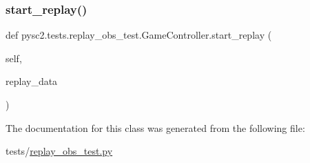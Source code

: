 \subsubsection{\texorpdfstring{start\+\_\+replay()}{start\_replay()}}
{\footnotesize\ttfamily def pysc2.\+tests.\+replay\+\_\+obs\+\_\+test.\+Game\+Controller.\+start\+\_\+replay (\begin{DoxyParamCaption}\item[{}]{self,  }\item[{}]{replay\+\_\+data }\end{DoxyParamCaption})}



The documentation for this class was generated from the following file\+:\begin{DoxyCompactItemize}
\item 
tests/\mbox{\hyperlink{replay__obs__test_8py}{replay\+\_\+obs\+\_\+test.\+py}}\end{DoxyCompactItemize}
